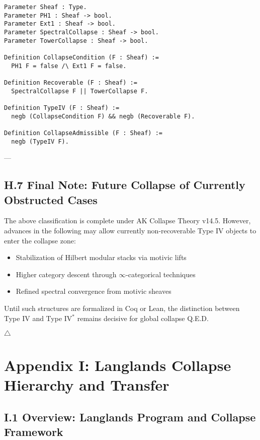 \documentclass[11pt]{article}
\begin{document}
\begin{lstlisting}[language=Coq, caption={Coq Predicate: Type IV and Recoverable IV$^*$}]
Parameter Sheaf : Type.
Parameter PH1 : Sheaf -> bool.
Parameter Ext1 : Sheaf -> bool.
Parameter SpectralCollapse : Sheaf -> bool.
Parameter TowerCollapse : Sheaf -> bool.

Definition CollapseCondition (F : Sheaf) :=
  PH1 F = false /\ Ext1 F = false.

Definition Recoverable (F : Sheaf) :=
  SpectralCollapse F || TowerCollapse F.

Definition TypeIV (F : Sheaf) :=
  negb (CollapseCondition F) && negb (Recoverable F).

Definition CollapseAdmissible (F : Sheaf) :=
  negb (TypeIV F).
\end{lstlisting}

---

\subsection*{H.7 Final Note: Future Collapse of Currently Obstructed Cases}

The above classification is complete under AK Collapse Theory v14.5.  
However, advances in the following may allow currently non-recoverable Type IV objects to enter the collapse zone:

\begin{itemize}
  \item Stabilization of Hilbert modular stacks via motivic lifts
  \item Higher category descent through \(\infty\)-categorical techniques
  \item Refined spectral convergence from motivic sheaves
\end{itemize}

Until such structures are formalized in Coq or Lean, the distinction between Type IV and Type IV$^\ast$ remains decisive for global collapse Q.E.D.

\hfill $\triangle$



\section*{Appendix I: Langlands Collapse Hierarchy and Transfer}

\subsection*{I.1 Overview: Langlands Program and Collapse Framework}
\end{document}
